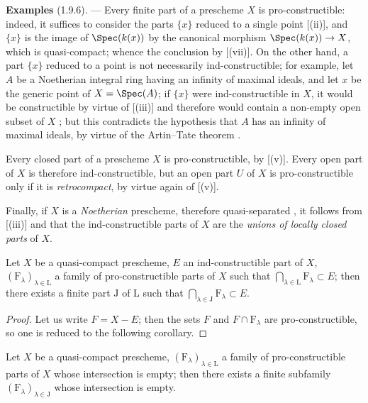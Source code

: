 \begin{env}[1.9.6]
\label{IV.1.9.6}
\textbf{Examples} (1.9.6). ---
Every finite part of a prescheme $X$ is pro-constructible: indeed, it suffices to consider the parts $\{x\}$ reduced to a single point [(ii)], and $\{x\}$ is the image of $\Spec(k(x))$ by the canonical morphism $\Spec(k(x))\to X$, which is quasi-compact; whence the conclusion by [(vii)].
On the other hand, a part $\{x\}$ reduced to a point is not necessarily ind-constructible; for example, let $A$ be a Noetherian integral ring having an infinity of maximal ideals, and let $x$ be the generic point of $X=\Spec(A)$; if $\{x\}$ were ind-constructible in $X$, it would be constructible by virtue of [(iii)] and therefore would contain a non-empty open subset of $X$ ; but this contradicts the hypothesis that $A$ has an infinity of maximal ideals, by virtue of the Artin--Tate theorem .

Every closed part of a prescheme $X$ is pro-constructible, by [(v)].
Every open part of $X$ is therefore ind-constructible, but an open part $U$ of $X$ is pro-constructible only if it is \emph{retrocompact}, by virtue again of [(v)].

Finally, if $X$ is a \emph{Noetherian} prescheme, therefore quasi-separated , it follows from [(iii)] and  that the ind-constructible parts of $X$ are the \emph{unions of locally closed parts} of $X$.
\end{env}

\begin{theorem}[1.9.7]
\label{IV.1.9.7}
Let $X$ be a quasi-compact prescheme, $E$ an ind-constructible part of $X$, $(\mathrm{F}_\lambda)_{\lambda\in\mathrm{L}}$ a family of pro-constructible parts of $X$ such that $\bigcap_{\lambda\in\mathrm{L}} \mathrm{F}_\lambda\subset E$; then there exists a finite part $\mathrm{J}$ of $\mathrm{L}$ such that $\bigcap_{\lambda\in\mathrm{J}} \mathrm{F}_\lambda\subset E$.
\end{theorem}

\begin{proof}
Let us write $F=X-E$; then the sets $F$ and $F\cap\mathrm{F}_\lambda$ are pro-constructible, so one is reduced to the following corollary.
\end{proof}

\begin{corollary}[1.9.8]
\label{IV.1.9.8}
Let $X$ be a quasi-compact prescheme, $(\mathrm{F}_\lambda)_{\lambda\in\mathrm{L}}$ a family of pro-constructible parts of $X$ whose intersection is empty; then there exists a finite subfamily $(\mathrm{F}_\lambda)_{\lambda\in\mathrm{J}}$ whose intersection is empty.
\end{corollary}

